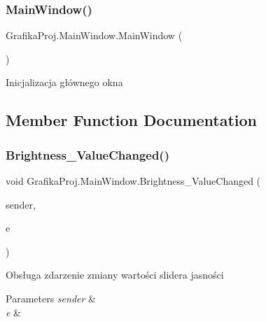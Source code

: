 \subsubsection{\texorpdfstring{MainWindow()}{MainWindow()}}
{\footnotesize\ttfamily Grafika\+Proj.\+Main\+Window.\+Main\+Window (\begin{DoxyParamCaption}{ }\end{DoxyParamCaption})}



Inicjalizacja głównego okna 



\subsection{Member Function Documentation}
\mbox{\label{class_grafika_proj_1_1_main_window_a7d75ee46d529a9c3f8cba914bc6ce0c1}} 
\subsubsection{\texorpdfstring{Brightness\_ValueChanged()}{Brightness\_ValueChanged()}}
{\footnotesize\ttfamily void Grafika\+Proj.\+Main\+Window.\+Brightness\+\_\+\+Value\+Changed (\begin{DoxyParamCaption}\item[{object}]{sender,  }\item[{Routed\+Property\+Changed\+Event\+Args$<$ double $>$}]{e }\end{DoxyParamCaption})\hspace{0.3cm}{\ttfamily [private]}}



Obsługa zdarzenie zmiany wartości slider\textquotesingle{}a jasności 


\begin{DoxyParams}{Parameters}
{\em sender} & \\
\hline
{\em e} & \\
\hline
\end{DoxyParams}
\mbox{\label{class_grafika_proj_1_1_main_window_a787e0f1c91e2c159b35271e5ff3b4ec6}} 
